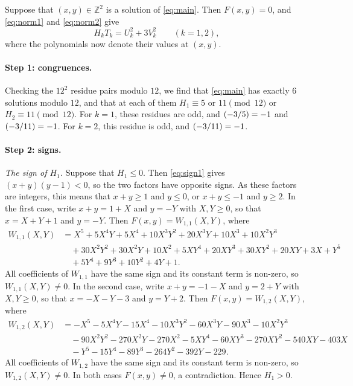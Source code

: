 \documentclass[11pt]{article}
\newcommand{\Z}{\mathbb{Z}}
\newcommand{\leg}[2]{\mathchoice{\biggl(\dfrac{#1}{#2}\biggr)}{(#1/#2)}{(#1/#2)}{(#1/#2)}}
\begin{document}
Suppose that $(x,y)\in\Z^2$ is a solution of \eqref{eq:main}. Then $F(x,y)=0$, and \eqref{eq:norm1} and \eqref{eq:norm2} give
\begin{equation}\label{eq:HT}
H_kT_k=U_k^2+3V_k^2\qquad(k=1,2),
\end{equation}
where the polynomials now denote their values at $(x,y)$.

\paragraph{Step 1: congruences.} Checking the $12^2$ residue pairs modulo $12$, we find that \eqref{eq:main} has exactly 6 solutions modulo $12$, and that at each of them $H_{1}\equiv5\text{ or }11\pmod{12}$ or $H_{2}\equiv11\pmod{12}$. For $k=1$, these residues are odd, and $\leg{-3}{5}=-1$ and $\leg{-3}{11}=-1$. For $k=2$, this residue is odd, and $\leg{-3}{11}=-1$.

\paragraph{Step 2: signs.} \emph{The sign of $H_{1}$.} Suppose that $H_{1}\leq0$. Then \eqref{eq:sign1} gives $(x+y)(y-1)<0$, so the two factors have opposite signs. As these factors are integers, this means that $x+y\geq1$ and $y\leq0$, or $x+y\leq-1$ and $y\geq2$. In the first case, write $x+y=1+X$ and $y=-Y$ with $X,Y\geq0$, so that $x=X+Y+1$ and $y=-Y$. Then $F(x,y)=W_{1,1}(X,Y)$, where
\begin{align*}
W_{1,1}(X,Y)&=X^{5}+5X^{4}Y+5X^{4}+10X^{3}Y^{2}+20X^{3}Y+10X^{3}+10X^{2}Y^{3}\\
&\quad+30X^{2}Y^{2}+30X^{2}Y+10X^{2}+5XY^{4}+20XY^{3}+30XY^{2}+20XY+3X+Y^{5}\\
&\quad+5Y^{4}+9Y^{3}+10Y^{2}+4Y+1.
\end{align*}
All coefficients of $W_{1,1}$ have the same sign and its constant term is non-zero, so $W_{1,1}(X,Y)\neq0$. In the second case, write $x+y=-1-X$ and $y=2+Y$ with $X,Y\geq0$, so that $x=-X-Y-3$ and $y=Y+2$. Then $F(x,y)=W_{1,2}(X,Y)$, where
\begin{align*}
W_{1,2}(X,Y)&=-X^{5}-5X^{4}Y-15X^{4}-10X^{3}Y^{2}-60X^{3}Y-90X^{3}-10X^{2}Y^{3}\\
&\quad-90X^{2}Y^{2}-270X^{2}Y-270X^{2}-5XY^{4}-60XY^{3}-270XY^{2}-540XY-403X\\
&\quad-Y^{5}-15Y^{4}-89Y^{3}-264Y^{2}-392Y-229.
\end{align*}
All coefficients of $W_{1,2}$ have the same sign and its constant term is non-zero, so $W_{1,2}(X,Y)\neq0$. In both cases $F(x,y)\neq0$, a contradiction. Hence $H_{1}>0$.
\end{document}
